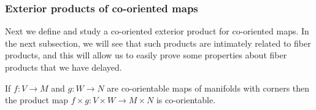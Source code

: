 \subsubsection{Exterior products of co-oriented maps}

Next we define and study a co-oriented exterior product for co-oriented maps.
In the next subsection, we will see that such products are intimately related to fiber products, and this will allow us to easily prove some properties about fiber products that we have delayed.

\begin{lemma}
	If $f \colon V \to M$ and $g \colon W \to N$ are co-orientable maps of manifolds with corners then the product map $f \times g \colon V \times W \to M \times N$ is co-orientable.
\end{lemma}

